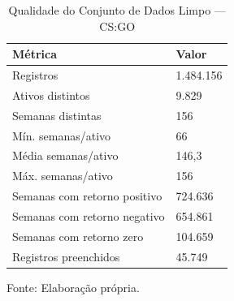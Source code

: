 \begin{table}[H]
\caption{Qualidade do Conjunto de Dados Limpo — CS:GO}\label{tab:quality} 

\fontsize{12.0pt}{14.4pt}\selectfont

\begin{tabular*}{\linewidth}{@{\extracolsep{\fill}}ll}
\toprule
\textbf{Métrica} & \textbf{Valor} \\
\midrule\addlinespace[2.5pt]
Registros & 1.484.156 \\
Ativos distintos & 9.829 \\
Semanas distintas & 156 \\
Mín. semanas/ativo & 66 \\
Média semanas/ativo & 146,3 \\
Máx. semanas/ativo & 156 \\
Semanas com retorno positivo & 724.636 \\
Semanas com retorno negativo & 654.861 \\
Semanas com retorno zero & 104.659 \\
Registros preenchidos & 45.749 \\
\bottomrule
\end{tabular*}
\par\vspace{\belowcaptionskip}\footnotesize Fonte: Elaboração própria.\par

\end{table}
